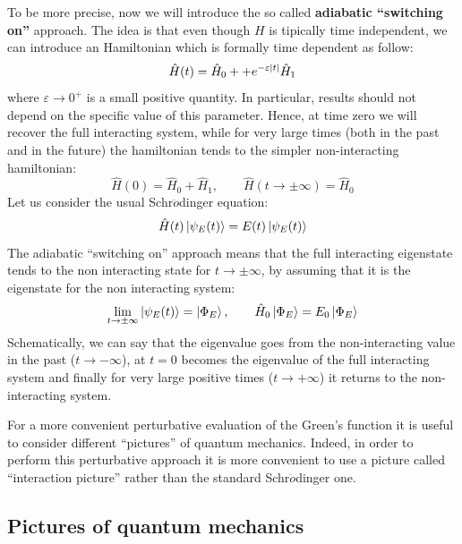 \documentclass[../main/main.tex]{subfiles}
\begin{document}
To be more precise, now we will introduce the so called \textbf{adiabatic  “switching on”} approach.  The idea is that even though \( H \) is tipically time independent, we can introduce an Hamiltonian which is formally time dependent as follow:
\begin{equation*}
  \hat{H} (t) = \hat{H}_0 + + e^{-\varepsilon \abs{t} } \hat{H}_1
\end{equation*}
where \( \varepsilon \rightarrow 0^+  \) is a small positive quantity. In particular, results should not depend on the specific value of this parameter.
Hence, at time zero we will recover the full interacting system, while for very large times (both in the past and in the future) the hamiltonian tends to the simpler non-interacting hamiltonian:
\begin{equation*}
  \hat{H} (0) = \hat{H}_0 + \hat{H}_1, \qquad \hat{H} (t \rightarrow \pm \infty ) = \hat{H}_0
\end{equation*}
Let us consider the usual Schr$\ddot{o}$dinger equation:
\begin{equation*}
  \hat{H} (t) \ket{\psi _E (t)} = E(t)  \ket{\psi _E (t)}
\end{equation*}
The adiabatic “switching on” approach means that the full interacting eigenstate tends to the non interacting state for \( t \rightarrow \pm \infty \), by assuming that it is the eigenstate for the non interacting system:
\begin{equation*}
  \lim_{t \rightarrow \pm \infty } \ket{\psi _E (t)} = \ket{\Phi _E}, \qquad \hat{H}_0 \ket{\Phi _E} = E_0 \ket{\Phi _E}
\end{equation*}
Schematically, we can say that the eigenvalue goes from the non-interacting value in the past (\( t \rightarrow - \infty  \)), at \( t=0 \) becomes the eigenvalue of the full interacting system and finally for very large positive times (\( t \rightarrow +\infty  \)) it returns to the non-interacting system.

For a more convenient perturbative evaluation of the Green's function it is useful to consider different “pictures” of quantum mechanics. Indeed, in order to perform this perturbative approach it is more convenient to use a picture called “interaction picture” rather than the standard Schr$\ddot{o}$dinger one.

\subsection{Pictures of quantum mechanics}
\end{document}
